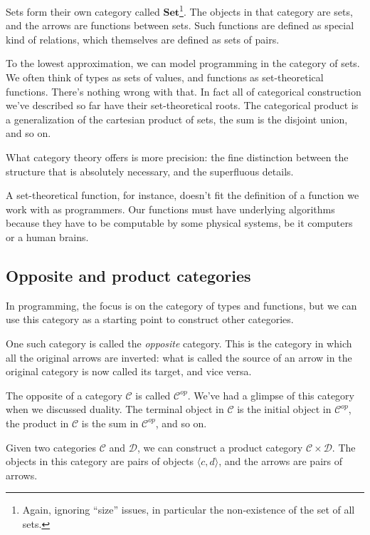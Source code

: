\documentclass[DaoFP]{subfiles}
\begin{document}
Sets form their own category called $\mathbf{Set}$\footnote{Again, ignoring ``size'' issues, in particular the non-existence of the set of all sets.}. The objects in that category are sets, and the arrows are functions between sets. Such functions are defined as special kind of relations, which themselves are defined as sets of pairs.

To the lowest approximation, we can model programming in the category of sets. We often think of types as sets of values, and functions as set-theoretical functions. There's nothing wrong with that. In fact all of categorical construction we've described so far have their set-theoretical roots. The categorical product is a generalization of the cartesian product of sets, the sum is the disjoint union, and so on. 

What category theory offers is more precision: the fine distinction between the structure that is absolutely necessary, and the superfluous details. 

A set-theoretical function, for instance, doesn't fit the definition of a function we work with as programmers. Our functions must have underlying algorithms because they have to be computable by some physical systems, be it computers or a human brains. 

\subsection{Opposite and product categories}
In programming, the focus is on the category of types and functions, but we can use this category as a starting point to construct other categories. 
 
One such category is called the \emph{opposite} category. This is the category in which all the original arrows are inverted: what is called the source of an arrow in the original category is now called its target, and vice versa. 

The opposite of a category $\mathcal{C}$ is called $\mathcal{C}^{op}$. We've had a glimpse of this category when we discussed duality. The terminal object in  $\mathcal{C}$ is the initial object in $\mathcal{C}^{op}$, the product in  $\mathcal{C}$ is the sum in $\mathcal{C}^{op}$, and so on. 

Given two categories $\mathcal{C}$ and $\mathcal{D}$, we can construct a product category $\mathcal{C} \times \mathcal{D}$. The objects in this category are pairs of objects $\langle c, d \rangle $, and the arrows are pairs of arrows. 
\end{document}
